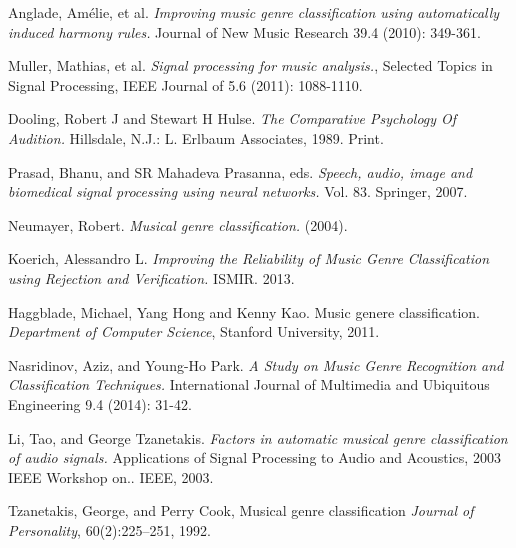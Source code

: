 \begin{thebibliography}{9}
                Anglade, Amélie, et al. 
                \emph{Improving music genre classification using automatically induced harmony rules.} 
                Journal of New Music Research 39.4 (2010): 349-361.

                Muller, Mathias, et al. 
                \emph{Signal processing for music analysis.}, 
                Selected Topics in Signal Processing, IEEE Journal of 5.6 (2011): 1088-1110.

                Dooling, Robert J and Stewart H Hulse. 
                \emph{The Comparative Psychology Of Audition.} 
                Hillsdale, N.J.: L. Erlbaum Associates, 1989. Print.

                Prasad, Bhanu, and SR Mahadeva Prasanna, eds. 
                \emph{Speech, audio, image and biomedical signal processing using neural networks.} 
                Vol. 83. Springer, 2007.

                Neumayer, Robert. 
                \emph{Musical genre classification.} 
                (2004).

                Koerich, Alessandro L. 
                \emph{Improving the Reliability of Music Genre Classification using Rejection and Verification.} 
                ISMIR. 2013.

                Haggblade, Michael, Yang Hong and Kenny Kao. Music genere classification.
                \emph{Department of Computer Science},
                Stanford University,
                2011.

                Nasridinov, Aziz, and Young-Ho Park. 
                \emph{A Study on Music Genre Recognition and Classification Techniques.} 
                International Journal of Multimedia and Ubiquitous Engineering 9.4 (2014): 31-42.

                Li, Tao, and George Tzanetakis. 
                \emph{Factors in automatic musical genre classification of audio signals.} 
                Applications of Signal Processing to Audio and Acoustics, 2003 IEEE Workshop on.. IEEE, 2003.

                Tzanetakis, George, and Perry Cook, Musical genre classification 
                \emph{Journal of Personality},
                60(2):225–251,
                1992.


\end{thebibliography}
